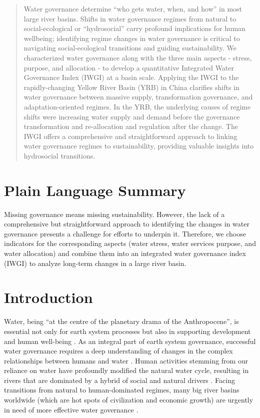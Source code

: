 \documentclass[draft]{../agujournal2019}
\begin{document}
\begin{abstract}
Water governance determine ``who gets water, when, and how'' in most large river basins.
Shifts in water governance regimes from natural to social-ecological or ``hydrosocial'' carry profound implications for human wellbeing; identifying regime changes in water governance is critical to navigating social-ecological transitions and guiding sustainability.
We characterized water governance along with the three main aspects - stress, purpose, and allocation - to develop a quantitative Integrated Water Governance Index (IWGI) at a basin scale.
Applying the IWGI to the rapidly-changing Yellow River Basin (YRB) in China clarifies shifts in water governance between massive supply, transformation governance, and adaptation-oriented regimes.
In the YRB, the underlying causes of regime shifts were increasing water supply and demand before the governance transformation and re-allocation and regulation after the change.
The IWGI offers a comprehensive and straightforward approach to linking water governance regimes to sustainability, providing valuable insights into hydrosocial transitions.
\end{abstract}

\section*{Plain Language Summary}
Missing governance means missing sustainability. However, the lack of a comprehensive but straightforward approach to identifying the changes in water governance presents a challenge for efforts to underpin it. Therefore, we choose indicators for the corresponding aspects (water stress, water services purpose, and water allocation) and combine them into an integrated water governance index (IWGI) to analyze long-term changes in a large river basin.


\section{Introduction}\label{sec1}
\label{Intro.}
Water, being ``at the centre of the planetary drama of the Anthropocene'', is essential not only for earth system processes but also in supporting development and human well-being
\cite{gleeson2020a,gleeson2020b}.
As an integral part of earth system governance, successful water governance requires a deep understanding of changes in the complex relationships between humans and water
\cite{ahlstrom2021,biermann2012,steffen2020}.
Human activities stemming from our reliance on water have profoundly modified the natural water cycle, resulting in rivers that are dominated by a hybrid of social and natural drivers
\cite{sivapalan2012,qin2014a,abbott2019}.
Facing transitions from natural to human-dominated regimes, many big river basins worldwide (which are hot spots of civilization and economic growth) are urgently in need of more effective water governance
\cite{best2019,dibaldassarre2019}.
\end{document}
